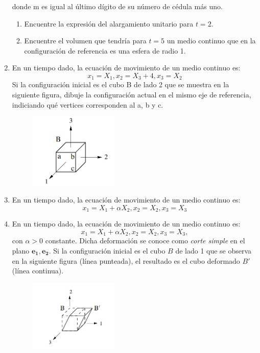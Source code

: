 \documentclass[12pt,a4paper]{article}
\begin{document}
\begin{enumerate}
   donde m es igual al último dígito de su número de cédula más uno.
   \begin{enumerate}
       \item Encuentre la expresión del alargamiento unitario para $t=2$.
       \item Encuentre el volumen que tendría para $t=5$ un medio continuo que en la
       configuración de referencia es una esfera de radio 1.
   \end{enumerate}
\item En un tiempo dado, la ecuación de movimiento de un medio continuo es:
    \begin{equation}
        x_1=X_1,x_2=X_3+4,x_3=X_2
    \end{equation}
    Si la configuración inicial es el cubo B de lado 2 que se muestra en la siguiente figura, dibuje la configuración  actual en el mismo eje de referencia, indiciando qué vertices corresponden al a, b y c.   
    \begin{figure}[H]
        \centering
        \includegraphics[width=0.4\textwidth]{tp3-2.png}
    \end{figure}
    \item En un tiempo dado, la ecuación de movimiento de un medio continuo es:
    \begin{equation}
        x_1=X_1+\alpha X_2,x_2=X_2,x_3=X_3
    \end{equation}
    \item En un tiempo dado, la ecuación de movimiento de un medio continuo es:
    \begin{equation}
        x_1=X_1+\alpha X_2,x_2=X_2,x_3=X_3, 
    \end{equation}
    con $\alpha>0$ constante. Dicha deformación se conoce como \textit{corte simple} en el plano $\mathbf{e_1,e_2}$. Si la configuración inicial es el cubo $B$ de lado 1 que se observa en la siguiente figura (línea punteada), el resultado es el cubo deformado $B'$ (línea continua).    
    \begin{figure}[H]
        \centering
        \includegraphics[width=0.4\textwidth]{tp3-3.png}

\end{figure}
\end{enumerate}
\end{document}
